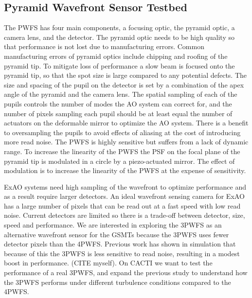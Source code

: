 \documentclass[12pt]{spieman}  %
\newcommand{\jrmcom}[1]{\textcolor{red}{[#1]}}
\begin{document}
\begin{spacing}{2}
\subsection{Pyramid Wavefront Sensor Testbed}

The PWFS has four main components, a focusing optic, the pyramid optic, a camera lens, and the detector. The pyramid optic needs to be high quality so that performance is not lost due to manufacturing errors. Common manufacturing errors of pyramid optics include chipping and roofing of the pyramid tip. To mitigate loss of performance a slow beam is focused onto the pyramid tip, so that the spot size is large compared to any potential defects. The size and spacing of the pupil on the detector is set by a combination of the apex angle of the pyramid and the camera lens. The spatial sampling of each of the pupils controls the number of modes the AO system can correct for, and the number of pixels sampling each pupil should be at least equal the number of actuators on the deformable mirror to optimize the AO system. There is a benefit to oversampling the pupils to avoid effects of aliasing at the cost of introducing more read noise. The PWFS is highly sensitive but suffers from a lack of dynamic range. To increase the linearity of the PWFS the PSF on the focal plane of the pyramid tip is modulated in a circle by a piezo-actuated mirror. The effect of modulation is to increase the linearity of the PWFS at the expense of sensitivity. 

ExAO systems need high sampling of the wavefront to optimize performance and as a result require larger detectors. An ideal wavefront sensing camera for ExAO has a large number of pixels that can be read out at a fast speed with low read noise. Current detectors are limited so there is a trade-off between detector, size, speed and performance. We are interested in exploring the 3PWFS as an alternative wavefront sensor for the GSMTs because the 3PWFS uses fewer detector pixels than the 4PWFS. Previous work has shown in simulation that because of this the 3PWFS is less sensitive to read noise, resulting in a modest boost in performance. (CITE myself). On CACTI we want to test the performance of a real 3PWFS, and expand the previous study to understand how the 3PWFS performs under different turbulence conditions compared to the 4PWFS. 


\end{spacing}
\end{document}

